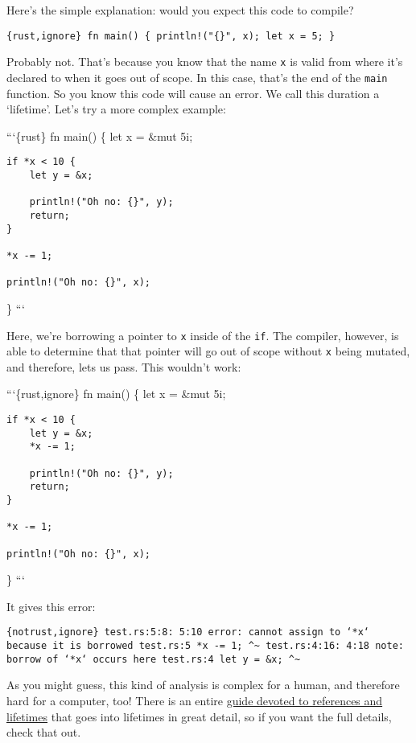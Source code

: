 \documentclass[]{article}
\begin{document}
Here's the simple explanation: would you expect this code to compile?

\texttt{\{rust,ignore\} fn main() \{     println!("\{\}", x);     let x = 5; \}}

Probably not. That's because you know that the name \texttt{x} is valid
from where it's declared to when it goes out of scope. In this case,
that's the end of the \texttt{main} function. So you know this code will
cause an error. We call this duration a `lifetime'. Let's try a more
complex example:

```\{rust\} fn main() \{ let x = \&mut 5i;

\begin{verbatim}
if *x < 10 {
    let y = &x;

    println!("Oh no: {}", y);
    return;
}

*x -= 1;

println!("Oh no: {}", x);
\end{verbatim}

\} ```

Here, we're borrowing a pointer to \texttt{x} inside of the \texttt{if}.
The compiler, however, is able to determine that that pointer will go
out of scope without \texttt{x} being mutated, and therefore, lets us
pass. This wouldn't work:

```\{rust,ignore\} fn main() \{ let x = \&mut 5i;

\begin{verbatim}
if *x < 10 {
    let y = &x;
    *x -= 1;

    println!("Oh no: {}", y);
    return;
}

*x -= 1;

println!("Oh no: {}", x);
\end{verbatim}

\} ```

It gives this error:

\texttt{\{notrust,ignore\} test.rs:5:8: 5:10 error: cannot assign to `*x` because it is borrowed test.rs:5         *x -= 1;                   \^{}\textasciitilde{} test.rs:4:16: 4:18 note: borrow of `*x` occurs here test.rs:4         let y = \&x;                           \^{}\textasciitilde{}}

As you might guess, this kind of analysis is complex for a human, and
therefore hard for a computer, too! There is an entire
\href{guide-lifetimes.html}{guide devoted to references and lifetimes}
that goes into lifetimes in great detail, so if you want the full
details, check that out.
\end{document}

